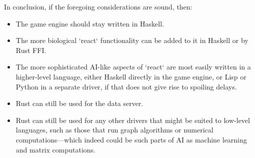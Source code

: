 In conclusion, if the foregoing considerations are sound, then:
\begin{itemize}
    \item The game engine should stay written in Haskell.
    \item The more biological `react` functionality can be added to it in
    Haskell or by Rust FFI\@.
    \item The more sophisticated AI-like aspects of `react` are most easily
    written in a higher-level language, either Haskell directly in the game
    engine, or Lisp or Python in a separate driver, if that does not
    give rise to spoiling delays.
    \item Rust can still be used for the data server.
    \item Rust can still be used for any other drivers that might be
    suited to low-level languages, such as those that run graph algorithms or
    numerical computations---which indeed could be such parts of AI as machine
    learning and matrix computations.
\end{itemize}